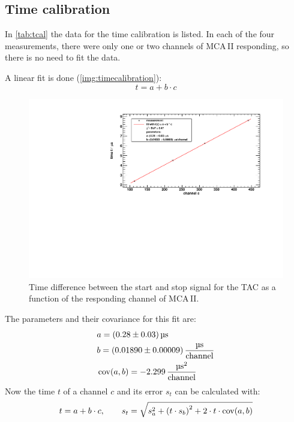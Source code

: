 \subsection{Time calibration}
In \autoref{tab:tcal} the data for the time calibration is listed.
In each of the four measurements, there were only one or two channels of MCA\,II responding,
so there is no need to fit the data.

A linear fit is done (\autoref{img:timecalibration}):
\begin{equation}
    t = a + b \cdot c
\end{equation}
\begin{figure}[H]
\begin{center}
  \includegraphics[width=\textwidth]{../img/timeCalibration.pdf}
  \caption{Time difference between the start and stop signal for the TAC as a function of the responding channel of MCA\,II.}
  \label{img:timecalibration}
\end{center}
\end{figure}
The parameters and their covariance for this fit are:
\begin{equation}
    \begin{split}
        & a = (0.28 \pm 0.03) \, \text{\textmu s} \\
        & b = (0.01890 \pm 0.00009) \, \frac{\text{\textmu s}}{\text{channel}} \\
        & \cov(a, b) = -2.299 \, \frac{\text{\textmu s}^2}{\text{channel}} 
    \end{split}
\end{equation}
Now the time $t$ of a channel $c$ and its error $s_t$ can be calculated with:
\begin{equation}
\label{eq:tcalibration}
    t = a + b \cdot c, \qquad s_t = \sqrt{s_a^2 + \left(t \cdot s_b \right)^2 + 2 \cdot t \cdot \operatorname{cov}(a,b)}
\end{equation}

